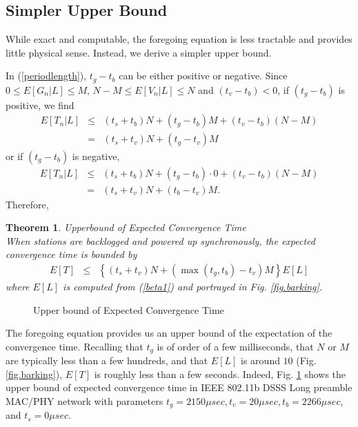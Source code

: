 \documentclass{acm_proc_article-sp}
\newtheorem{theorem}{Theorem}
\newcommand{\be}{\begin{eqnarray}}
\newcommand{\ee}{\end{eqnarray}}
\newcommand{\sub}{}
\begin{document}
\subsection{Simpler Upper Bound}
While exact and computable, the foregoing equation is less tractable and provides little physical sense. Instead, we derive a simpler upper bound.

In (\ref{periodlength}), $t_g - t_b$ can be either positive or negative. Since $0 \leq E[G_n|L] \leq M$, $N-M \leq E[V_n|L] \leq N$ and $(t_v - t_b) < 0$, if $(t_g - t_b)$ is positive, we find
\begin{eqnarray*}
E[T_n|L] &\leq& (t_s + t_b)N + (t_g - t_b)M + (t_v - t_b)(N-M) \\
&=& (t_s + t_v) N + (t_g - t_v)M\sub
\end{eqnarray*}
or if $(t_g - t_b)$ is negative,
\begin{eqnarray*}
E[T_n|L] &\leq& (t_s + t_b)N + (t_g - t_b)\cdot 0 + (t_v - t_b)(N-M) \\
&=& (t_s + t_v) N + (t_b - t_v)M.\sub
\end{eqnarray*}
Therefore,
\begin{theorem}{Upperbound of Expected Convergence Time}\\
\label{thm.upperbound}
When stations are backlogged and powered up synchronously, the expected convergence time is bounded by
\be \label{eqn.bound} E[T] &\leq& \left\{(t_s + t_v) N + (\max(t_g, t_b) - t_v) M \right\} E[L] \ee
where $E[L]$ is computed from (\ref{beta1}) and portrayed in Fig. \ref{fig.barking}.
\end{theorem}
\begin{figure}
   \begin{center}
   \end{center}
   \begin{center}
   \caption{Upper bound of Expected Convergence Time}
   \label{fig.upperbound}
   \end{center}
\vspace{-0.2in}
\end{figure}
The foregoing equation provides us an upper bound of the expectation of the convergence time. Recalling that $t_g$ is of order of a few milliseconds, that $N$ or $M$ are typically less than a few hundreds, and that $E[L]$ is around $10$ (Fig. \ref{fig.barking}), $E[T]$ is roughly less than a few seconds. Indeed, Fig. \ref{fig.upperbound} shows the upper bound of expected convergence time in IEEE 802.11b DSSS Long preamble MAC/PHY network with parameters $t_g = 2150 \mu sec, t_v = 20 \mu sec, t_b = 2266 \mu sec$, and $t_s = 0 \mu sec$.
\end{document}
